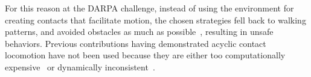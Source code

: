 
For this reason at the DARPA challenge, instead of using the environment for creating contacts that facilitate motion, the chosen strategies fell back to walking patterns, and avoided obstacles as much as possible~\citep{atkensondarpa}, resulting in unsafe behaviors. 
Previous contributions having demonstrated acyclic contact locomotion have not been used because they are either too computationally expensive~\citep{Bretl:2006:MPM:1124573.1124585} or dynamically inconsistent~\citep{Mordatch:2012:DCB:2185520.2185539}.

